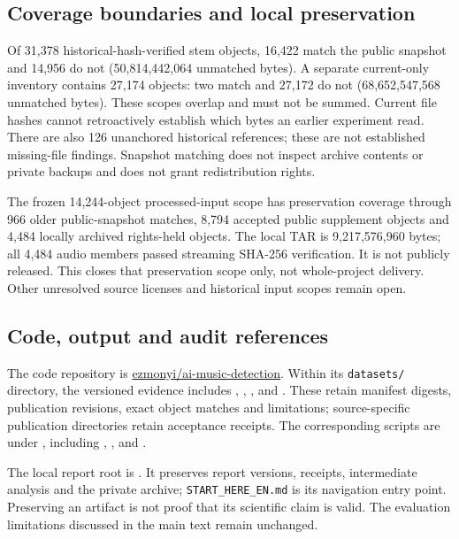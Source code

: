 \subsection{Coverage boundaries and local preservation}
Of 31,378 historical-hash-verified stem objects, 16,422 match the public snapshot
and 14,956 do not (50,814,442,064 unmatched bytes). A separate current-only
inventory contains 27,174 objects: two match and 27,172 do not
(68,652,547,568 unmatched bytes). These scopes overlap and must not be summed.
Current file hashes cannot retroactively establish which bytes an earlier
experiment read. There are also 126 unanchored historical references; these are
not established missing-file findings. Snapshot matching does not inspect
archive contents or private backups and does not grant redistribution rights.

The frozen 14,244-object processed-input scope has preservation coverage through
966 older public-snapshot matches, 8,794 accepted public supplement objects and
4,484 locally archived rights-held objects. The local TAR is 9,217,576,960 bytes;
all 4,484 audio members passed streaming SHA-256 verification. It is not publicly
released. This closes that preservation scope only, not whole-project delivery.
Other unresolved source licenses and historical input scopes remain open.

\subsection{Code, output and audit references}
\begingroup\raggedright
The code repository is
\href{https://github.com/ezmonyi/ai-music-detection}{ezmonyi/ai-music-detection}.
Within its \texttt{datasets/} directory, the versioned evidence includes
,
,
, and
.
These retain manifest digests, publication revisions, exact object matches and
limitations; source-specific publication directories retain acceptance receipts.
The corresponding scripts are under
, including
,
, and
.

The local report root is
.
It preserves report versions, receipts, intermediate analysis and the private
archive; \texttt{START\_HERE\_EN.md} is its navigation entry point.
Preserving an artifact is not proof that its scientific claim is valid. The
evaluation limitations discussed in the main text remain unchanged.
\par\endgroup
